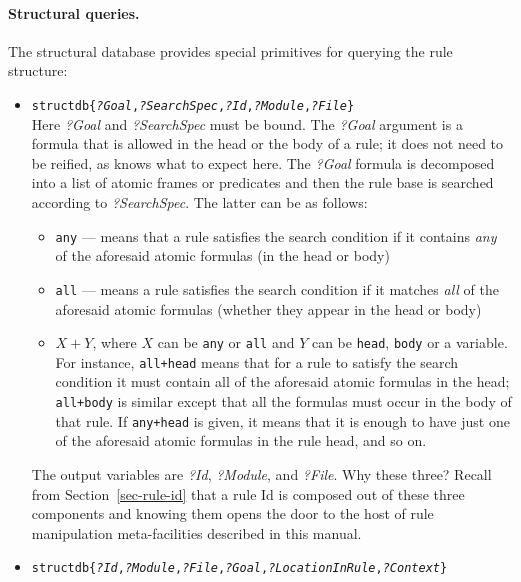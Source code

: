 \paragraph{Structural queries.}
The structural database provides special primitives for querying the rule
structure:
\begin{itemize}
\item 
  \texttt{structdb\{\textnormal{\textit{?Goal},\textit{?SearchSpec},\textit{?Id},\textit{?Module},\textit{?File}}\}
      }
      \\
      Here \emph{?Goal} and \emph{?SearchSpec} must be bound. The \emph{?Goal}
      argument is a formula that is allowed in the head or the body of a
      rule; it does not need to be reified, as \ERGO knows what to expect
      here.
      The \emph{?Goal}  formula is decomposed into a list of atomic frames
      or predicates
      and then the rule base is searched according to \emph{?SearchSpec}.
      The latter can be as follows:
      \begin{itemize}
      \item \texttt{any} --- means that a rule satisfies the search
        condition if it contains \emph{any} of the aforesaid atomic formulas
        (in the head or body)
      \item \texttt{all} --- means a rule satisfies the search
        condition if it matches  \emph{all}  of the aforesaid atomic formulas
        (whether they appear in the head or body)
      \item $X+Y$, where $X$ can be \texttt{any} or \texttt{all} and
        $Y$ can be \texttt{head}, \texttt{body} or a variable. For instance,
        \texttt{all+head} means that for a rule to satisfy the search
        condition it must contain all of the aforesaid atomic formulas in
        the head; \texttt{all+body} is similar except that all the formulas
        must occur in the body of that rule. If \texttt{any+head} is given,
        it means that it is enough to have just one of the aforesaid atomic
        formulas in the rule head, and so on.        
      \end{itemize}
      The output variables are \emph{?Id}, \emph{?Module}, and \emph{?File}.
      Why these three? Recall from Section~\ref{sec-rule-id} that a rule
      Id is composed out of these three components and knowing them opens
      the door to the host of rule manipulation meta-facilities described
      in this manual.
  \item
    \texttt{structdb\{\textnormal{\textit{?Id},\textit{?Module},\textit{?File},\textit{?Goal},\textit{?LocationInRule},\textit{?Context}}\}
}
\end{itemize}
